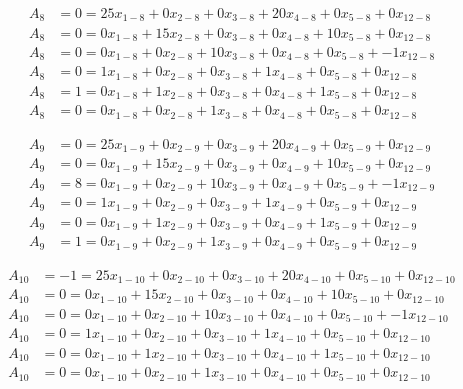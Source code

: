\vspace{-\baselineskip}\begin{align*}
	A_{8} &= 0 = 25x_{1-8} + 0x_{2-8} + 0x_{3-8} + 20x_{4-8} + 0x_{5-8} + 0x_{12-8} \\ 
	A_{8} &= 0 = 0x_{1-8} + 15x_{2-8} + 0x_{3-8} + 0x_{4-8} + 10x_{5-8} + 0x_{12-8} \\ 
	A_{8} &= 0 = 0x_{1-8} + 0x_{2-8} + 10x_{3-8} + 0x_{4-8} + 0x_{5-8} + -1x_{12-8} \\ 
	A_{8} &= 0 = 1x_{1-8} + 0x_{2-8} + 0x_{3-8} + 1x_{4-8} + 0x_{5-8} + 0x_{12-8} \\ 
	A_{8} &= 1 = 0x_{1-8} + 1x_{2-8} + 0x_{3-8} + 0x_{4-8} + 1x_{5-8} + 0x_{12-8} \\ 
	A_{8} &= 0 = 0x_{1-8} + 0x_{2-8} + 1x_{3-8} + 0x_{4-8} + 0x_{5-8} + 0x_{12-8}
\end{align*}

\vspace{-\baselineskip}\begin{align*}
	A_{9} &= 0 = 25x_{1-9} + 0x_{2-9} + 0x_{3-9} + 20x_{4-9} + 0x_{5-9} + 0x_{12-9} \\ 
	A_{9} &= 0 = 0x_{1-9} + 15x_{2-9} + 0x_{3-9} + 0x_{4-9} + 10x_{5-9} + 0x_{12-9} \\ 
	A_{9} &= 8 = 0x_{1-9} + 0x_{2-9} + 10x_{3-9} + 0x_{4-9} + 0x_{5-9} + -1x_{12-9} \\ 
	A_{9} &= 0 = 1x_{1-9} + 0x_{2-9} + 0x_{3-9} + 1x_{4-9} + 0x_{5-9} + 0x_{12-9} \\ 
	A_{9} &= 0 = 0x_{1-9} + 1x_{2-9} + 0x_{3-9} + 0x_{4-9} + 1x_{5-9} + 0x_{12-9} \\ 
	A_{9} &= 1 = 0x_{1-9} + 0x_{2-9} + 1x_{3-9} + 0x_{4-9} + 0x_{5-9} + 0x_{12-9}
\end{align*}

\vspace{-\baselineskip}\begin{align*}
	A_{10} &= -1 = 25x_{1-10} + 0x_{2-10} + 0x_{3-10} + 20x_{4-10} + 0x_{5-10} + 0x_{12-10} \\ 
	A_{10} &= 0 = 0x_{1-10} + 15x_{2-10} + 0x_{3-10} + 0x_{4-10} + 10x_{5-10} + 0x_{12-10} \\ 
	A_{10} &= 0 = 0x_{1-10} + 0x_{2-10} + 10x_{3-10} + 0x_{4-10} + 0x_{5-10} + -1x_{12-10} \\ 
	A_{10} &= 0 = 1x_{1-10} + 0x_{2-10} + 0x_{3-10} + 1x_{4-10} + 0x_{5-10} + 0x_{12-10} \\ 
	A_{10} &= 0 = 0x_{1-10} + 1x_{2-10} + 0x_{3-10} + 0x_{4-10} + 1x_{5-10} + 0x_{12-10} \\ 
	A_{10} &= 0 = 0x_{1-10} + 0x_{2-10} + 1x_{3-10} + 0x_{4-10} + 0x_{5-10} + 0x_{12-10}
\end{align*}

